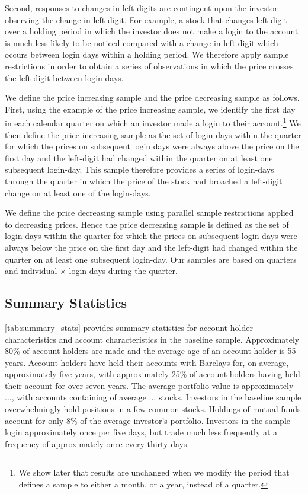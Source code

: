 Second, responses to changes in left-digits are contingent upon the investor observing the change in left-digit. For example, a stock that changes left-digit over a holding period in which the investor does not make a login to the account is much less likely to be noticed compared with a change in left-digit which occurs between login days within a holding period. We therefore apply sample restrictions in order to obtain a series of observations in which the price crosses the left-digit between login-days.

We define the price increasing sample and the price decreasing sample as follows. First, using the example of the price increasing sample, we identify the first day in each calendar quarter on which an investor made a login to their account.\footnote{We show later that results are unchanged when we modify the period that defines a sample to either a month, or a year, instead of a quarter.} We then define the price increasing sample as the set of login days within the quarter for which the prices on subsequent login days were always above the price on the first day and the left-digit had changed within the quarter on at least one subsequent login-day. This sample therefore provides a series of login-days through the quarter in which the price of the stock had broached a left-digit change on at least one of the login-days. 

We define the price decreasing sample using parallel sample restrictions applied to decreasing prices. Hence the price decreasing sample is defined as the set of login days within the quarter for which the prices on subsequent login days were always below the price on the first day and the left-digit had changed within the quarter on at least one subsequent login-day. Our samples are based on quarters and individual $\times$  login days during the quarter. 

\subsection{Summary Statistics}

\ref{tab:summary_stats} provides summary statistics for account holder characteristics and account characteristics in the baseline sample. Approximately 80\% of account holders are made and the average age of an account holder is 55 years. Account holders have held their accounts with Barclays for, on average, approximately five years, with approximately 25\% of account holders having held their account for over seven years. The average portfolio value is approximately ..., with accounts containing of average ... stocks. Investors in the baseline sample overwhelmingly hold positions in a few common stocks. Holdings of mutual funds account for only 8\% of the average investor's portfolio. Investors in the sample login approximately once per five days, but trade much less frequently at a frequency of approximately once every thirty days.

